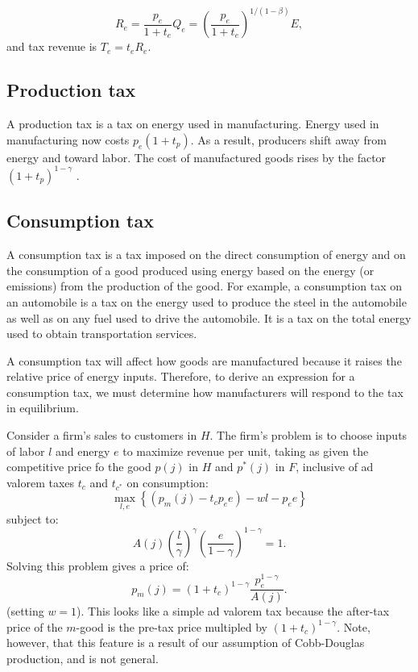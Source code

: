 \documentclass[notitlepage,12pt]{article}
\begin{document}
\begin{equation*}
R_{e}=\frac{p_{e}}{1+t_{e}}Q_{e}=\left( \frac{p_{e}}{1+t_{e}}\right)
^{1/\left( 1-\beta \right) }E,
\end{equation*}%
and tax revenue is $T_{e}=t_{e}R_{e}.$

\subsection{Production tax}

A production tax is a tax on energy used in manufacturing. Energy used in
manufacturing now costs $p_{e}\left( 1+t_{p}\right) $. As a result,
producers shift away from energy and toward labor. The cost of manufactured
goods rises by the factor $\left( 1+t_{p}\right) ^{1-\gamma }$ .

\subsection{Consumption tax}

A consumption tax is a tax imposed on the direct consumption of energy and
on the consumption of a good produced using energy based on the energy (or
emissions) from the production of the good. For example, a consumption tax
on an automobile is a tax on the energy used to produce the steel in the
automobile as well as on any fuel used to drive the automobile. It is a tax
on the total energy used to obtain transportation services.

A consumption tax will affect how goods are manufactured because it raises
the relative price of energy inputs. Therefore, to derive an expression for
a consumption tax, we must determine how manufacturers will respond to the
tax in equilibrium.

Consider a firm's sales to customers in $H$. The firm's problem is to choose
inputs of labor $l$ and energy $e$ to maximize revenue per unit, taking as
given the competitive price fo the good $p\left( j\right) $ in $H$ and $%
p^{\ast }\left( j\right) $ in $F$, inclusive of ad valorem taxes $t_{c}$ and 
$t_{c^{\ast }}$ on consumption: 
\begin{equation*}
\max_{l,e}\left\{ \left( p_{m}(j)-t_{c}p_{e}e\right) -wl-p_{e}e\right\} 
\end{equation*}%
subject to:%
\begin{equation*}
A(j)\left( \frac{l}{\gamma }\right) ^{\gamma }\left( \frac{e}{1-\gamma }%
\right) ^{1-\gamma }=1.
\end{equation*}%
Solving this problem gives a price of:%
\begin{equation*}
p_{m}(j)=\left( 1+t_{c}\right) ^{1-\gamma }\frac{p_{e}^{1-\gamma }}{A(j)}.
\end{equation*}%
(setting $w=1$). This looks like a simple ad valorem tax because the
after-tax price of the $m$-good is the pre-tax price multipled by $\left(
1+t_{c}\right) ^{1-\gamma }$. Note, however, that this feature is a result
of our assumption of Cobb-Douglas production, and is not general.
\end{document}
